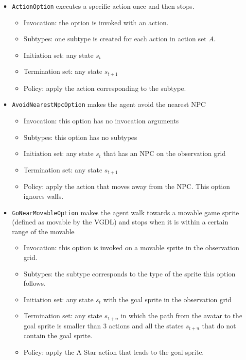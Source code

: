 \begin{itemize}
	\item \texttt{ActionOption} executes a specific action once and then
		stops.
		\begin{itemize}
			\item Invocation: the option is invoked with an action.
			\item Subtypes: one subtype is created for each action in action set
				$A$.
			\item Initiation set: any state $s_t$
			\item Termination set: any state $s_{t+1}$
			\item Policy: apply the action corresponding to the subtype.
		\end{itemize}
	\item \texttt{AvoidNearestNpcOption} makes the agent avoid the nearest NPC
		\begin{itemize}
			\item Invocation: this option has no invocation arguments
			\item Subtypes: this option has no subtypes
			\item Initiation set: any state $s_t$ that has an NPC on the
				observation grid
			\item Termination set: any state $s_{t+1}$
			\item Policy: apply the action that moves away from the NPC. This
				option ignores walls.
		\end{itemize}
	\item \texttt{GoNearMovableOption} makes the agent walk towards a
		movable game sprite (defined as movable by the VGDL) and stops when it
		is within a certain range of the movable
		\begin{itemize}
			\item Invocation: this option is invoked on a movable sprite in the
				observation grid.
			\item Subtypes: the subtype corresponds to the type of the sprite
				this option follows.
			\item Initiation set: any state $s_t$ with the goal sprite in the observation grid
			\item Termination set: any state $s_{t+n}$ in which the path from
				the avatar to the goal sprite is smaller than 3 actions and all the states
				$s_{t+n}$ that do not contain the goal sprite.
			\
			\item Policy: apply the A Star action that leads to the goal sprite.
		\end{itemize}

\end{itemize}
